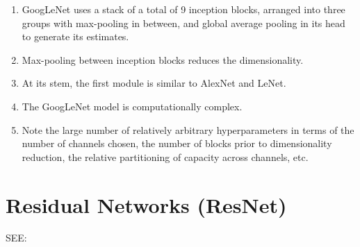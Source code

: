 \begin{enumerate}
    \item GoogLeNet uses a stack of a total of 9 inception blocks, arranged into three groups with max-pooling in between, and global average pooling in its head to generate its estimates. 
    
    \item Max-pooling between inception blocks reduces the dimensionality.

    \item At its stem, the first module is similar to AlexNet and LeNet.

    \item The GoogLeNet model is computationally complex. 
    
    \item Note the large number of relatively arbitrary hyperparameters in terms of the number of channels chosen, the number of blocks prior to dimensionality reduction, the relative partitioning of capacity across channels, etc.

    
\end{enumerate}



\section{Residual Networks (ResNet) \cite{dnn-1}} \label{Residual Networks (ResNet)}

SEE: 

